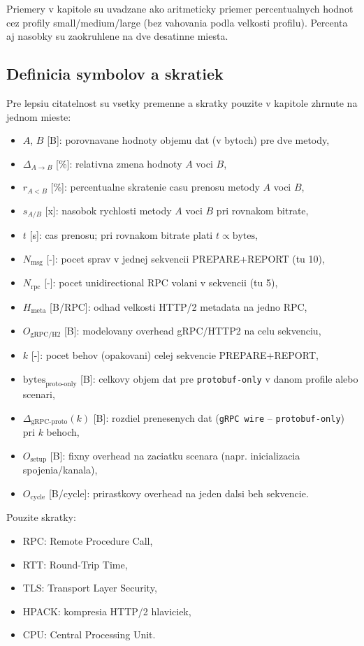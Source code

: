 \documentclass[12pt,a4paper]{report}
\begin{document}
Priemery v kapitole su uvadzane ako aritmeticky priemer percentualnych
hodnot cez profily small/medium/large (bez vahovania podla velkosti profilu).
Percenta aj nasobky su zaokruhlene na dve desatinne miesta.

\subsection{Definicia symbolov a skratiek}

Pre lepsiu citatelnost su vsetky premenne a skratky pouzite v kapitole
zhrnute na jednom mieste:
\begin{itemize}
  \item $A$, $B$ [B]: porovnavane hodnoty objemu dat (v bytoch) pre dve metody,
  \item $\Delta_{A \rightarrow B}$ [\%]: relativna zmena hodnoty $A$ voci $B$,
  \item $r_{A<B}$ [\%]: percentualne skratenie casu prenosu metody $A$ voci $B$,
  \item $s_{A/B}$ [x]: nasobok rychlosti metody $A$ voci $B$ pri rovnakom bitrate,
  \item $t$ [s]: cas prenosu; pri rovnakom bitrate plati $t \propto \text{bytes}$,
  \item $N_{\text{msg}}$ [-]: pocet sprav v jednej sekvencii PREPARE+REPORT (tu 10),
  \item $N_{\text{rpc}}$ [-]: pocet unidirectional RPC volani v sekvencii (tu 5),
  \item $H_{\text{meta}}$ [B/RPC]: odhad velkosti HTTP/2 metadata na jedno RPC,
  \item $O_{\text{gRPC/H2}}$ [B]: modelovany overhead gRPC/HTTP2 na celu sekvenciu,
  \item $k$ [-]: pocet behov (opakovani) celej sekvencie PREPARE+REPORT,
  \item $\text{bytes}_{\text{proto-only}}$ [B]: celkovy objem dat
  pre \texttt{protobuf-only} v danom profile alebo scenari,
  \item $\Delta_{\text{gRPC-proto}}(k)$ [B]: rozdiel prenesenych dat
  (\texttt{gRPC wire} -- \texttt{protobuf-only}) pri $k$ behoch,
  \item $O_{\text{setup}}$ [B]: fixny overhead na zaciatku scenara
  (napr. inicializacia spojenia/kanala),
  \item $O_{\text{cycle}}$ [B/cycle]: prirastkovy overhead na jeden dalsi beh sekvencie.
\end{itemize}

Pouzite skratky:
\begin{itemize}
  \item RPC: Remote Procedure Call,
  \item RTT: Round-Trip Time,
  \item TLS: Transport Layer Security,
  \item HPACK: kompresia HTTP/2 hlaviciek,
  \item CPU: Central Processing Unit.
\end{itemize}
\end{document}
